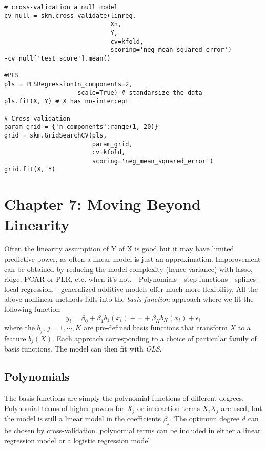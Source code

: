 \documentclass[
  letterpaper,
  DIV=11,
  numbers=noendperiod]{scrreprt}
\begin{document}
\begin{verbatim}
# cross-validation a null model
cv_null = skm.cross_validate(linreg,
                             Xn,
                             Y,
                             cv=kfold,
                             scoring='neg_mean_squared_error')
-cv_null['test_score'].mean()

#PLS
pls = PLSRegression(n_components=2, 
                    scale=True) # standarsize the data 
pls.fit(X, Y) # X has no-intercept 

# Cross-validation
param_grid = {'n_components':range(1, 20)}
grid = skm.GridSearchCV(pls,
                        param_grid,
                        cv=kfold,
                        scoring='neg_mean_squared_error')
grid.fit(X, Y)

\end{verbatim}


\chapter{Chapter 7: Moving Beyond
Linearity}\label{chapter-7-moving-beyond-linearity}

Often the linearity assumption of Y of X is good but it may have limited
predictive power, as often a linear model is just an approximation.
Imporovement can be obtained by reducing the model complexity (hence
variance) with lasso, ridge, PCAR or PLR, etc. when it's not, -
Polynomials - step functions - splines - local regression, - generalized
additive models offer much more flexibility. All the above nonlinear
methods falls into the \emph{basis function} approach where we fit the
following function \[
y_i=\beta_0+\beta_1b_1(x_i) +\cdots + \beta_K b_K(x_i) +\epsilon_i
\] where the \(b_j\), \(j=1, \cdots, K\) are pre-defined basis functions
that transform \(X\) to a feature \(b_j(X)\). Each approach
corresponding to a choice of particular family of basis functions. The
model can then fit with \emph{OLS}.

\section{Polynomials}\label{polynomials}

The basis functions are simply the polynomial functions of different
degrees. Polynomial terms of higher powers for \(X_j\) or interaction
terms \(X_iX_j\) are used, but the model is still a linear model in the
coefficients \(\beta_j\). The optimum degree \(d\) can be chosen by
cross-validation. polynomial terms can be included in either a linear
regression model or a logistic regression model.
\end{document}
